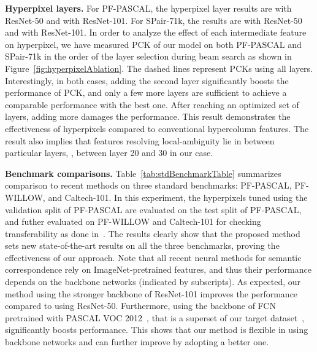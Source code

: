 \documentclass[10pt,twocolumn,letterpaper]{article}
\begin{document}
\smallbreak
\noindent \textbf{Hyperpixel layers.} 
For PF-PASCAL, the hyperpixel layer results are  with ResNet-50 and  with ResNet-101. For SPair-71k, the results are  with ResNet-50 and  with ResNet-101. In order to analyze the effect of each intermediate feature  on hyperpixel, we have measured PCK of our model on both PF-PASCAL and SPair-71k in the order of the layer selection during beam search as shown in Figure~\ref{fig:hyperpixelAblation}. The dashed lines represent PCKs using all layers. Interestingly, in both cases, adding the second layer significantly boosts the performance of PCK, and only a few more layers are sufficient to achieve a comparable performance with the best one. 
After reaching an optimized set of layers, adding more damages the performance. 
This result demonstrates the effectiveness of hyperpixels compared to conventional hypercolumn features. 
The result also implies that features resolving local-ambiguity lie in between particular layers, \eg, between layer 20 and 30 in our case. 



\smallbreak
\noindent \textbf{Benchmark comparisons.} 
Table~\ref{tab:stdBenchmarkTable} summarizes comparison to recent methods on three standard benchmarks: PF-PASCAL, PF-WILLOW, and Caltech-101. In this experiment, the hyperpixels tuned using the validation split of PF-PASCAL are evaluated on the test split of PF-PASCAL, and futher evaluated on PF-WILLOW and Caltech-101 for checking transferability as done in~\cite{han2017scnet, jeon2018parn, NIPS2018_7851, Rocco17, Rocco18, paul2018attentive}. 
The results clearly show that the proposed method sets new state-of-the-art results on all the three benchmarks, proving the effectiveness of our approach. Note that all recent neural methods for semantic correspondence rely 
on ImageNet-pretrained features, and thus their performance depends on the backbone networks (indicated by subscripts).
As expected, our method using the stronger backbone of ResNet-101 improves the performance compared to using ResNet-50. 
Furthermore, using the backbone of FCN~\cite{lin2017feature} pretrained with PASCAL VOC 2012~\cite{everingham2015pascal}, that is a superset of our target dataset~\cite{ham2016proposal}, significantly boosts performance.  
This shows that our method is flexible in using backbone networks and can further improve by adopting a better one.
\end{document}

